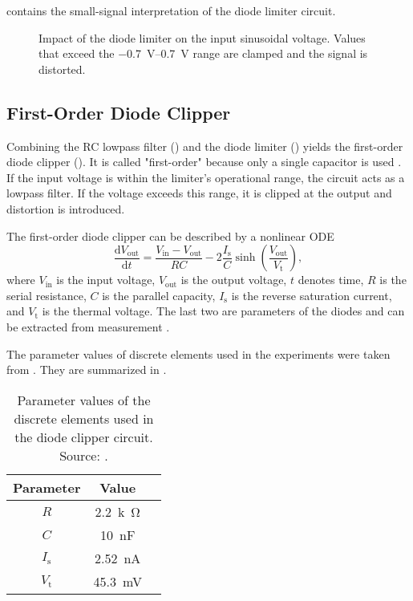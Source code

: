 \cite{Yeh2007} contains the small-signal interpretation of the diode limiter circuit.

\begin{figure}
  \centering
  
  \caption{Impact of the diode limiter on the input sinusoidal voltage. Values that exceed the \SIrange{-0.7}{0.7}{V} range are clamped and the signal is distorted.}
  \label{fig:diode_limiter_signal}
\end{figure}


\subsection*{First-Order Diode Clipper}
Combining the RC lowpass filter () and the diode limiter () yields the first-order diode clipper (). It is called "first-order" because only a single capacitor is used \cite{Parker2019}. If the input voltage is within the limiter's operational range, the circuit acts as a lowpass filter. If the voltage exceeds this range, it is clipped at the output and distortion is introduced.

The first-order diode clipper can be described by a nonlinear \ac{ODE} \cite{Yeh2007}
\begin{equation}
  \frac{\mathrm{d} V_\text{out}}{\mathrm{d}t} = \frac{V_\text{in} - V_\text{out}}{RC} - 2 \frac{I_\text{s}}{C} \sinh \left(\frac{V_\text{out}}{V_\text{t}}\right),
\end{equation}
where $V_\text{in}$ is the input voltage, $V_\text{out}$ is the output voltage, $t$ denotes time, $R$ is the serial resistance, $C$ is the parallel capacity, $I_\text{s}$ is the reverse saturation current, and $V_\text{t}$ is the thermal voltage. The last two are parameters of the diodes and can be extracted from measurement \cite{Yeh2007}.

The parameter values of discrete elements used in the experiments were taken from \cite{Yeh2008}. They are summarized in .

\begin{table}
  \centering
  \caption{Parameter values of the discrete elements used in the diode clipper circuit. Source: \cite{Yeh2008}.}
  \begin{tabular}{|c|c|c|}
    \hline
    Parameter & Value \\
    \hline
    $R$ & \SI{2.2}{k\ohm} \\
    $C$ & \SI{10}{nF} \\
    $I_\text{s}$ & \SI{2.52}{nA} \\
    $V_\text{t}$ & \SI{45.3}{mV} \\
    \hline
  \end{tabular}
  \label{tab:diode_clipper_element_parameters}
\end{table}

